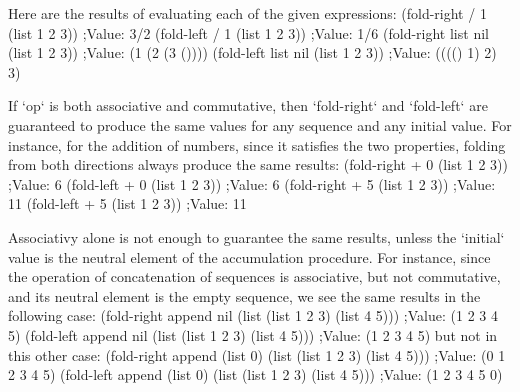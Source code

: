 Here are the results of evaluating each of the given expressions:
\begtt\scm
(fold-right / 1 (list 1 2 3))
;Value: 3/2 
(fold-left / 1 (list 1 2 3))
;Value: 1/6 
(fold-right list nil (list 1 2 3))
;Value: (1 (2 (3 ())))
(fold-left list nil (list 1 2 3))
;Value: (((() 1) 2) 3)
\endtt

If `op` is both associative and commutative,
 then `fold-right` and `fold-left` are guaranteed to produce the same values for any sequence and any initial value.  For instance, for the addition of numbers, since it satisfies the two properties, folding from both directions always produce the same results:
\begtt\scm
(fold-right + 0 (list 1 2 3))
;Value: 6
(fold-left + 0 (list 1 2 3))
;Value: 6
(fold-right + 5 (list 1 2 3))
;Value: 11
(fold-left + 5 (list 1 2 3))
;Value: 11
\endtt

Associativy alone is not enough to guarantee the same results, unless the `initial` value is the neutral element of the accumulation procedure.  For instance, since the operation of concatenation of sequences is associative, but not commutative, and its neutral element is the empty sequence, we see the same results in the following case:
\begtt\scm
(fold-right append nil (list (list 1 2 3) (list 4 5)))
;Value: (1 2 3 4 5)
(fold-left append nil (list (list 1 2 3) (list 4 5)))
;Value: (1 2 3 4 5)
\endtt
but not in this other case:
\begtt\scm
(fold-right append (list 0) (list (list 1 2 3) (list 4 5)))
;Value: (0 1 2 3 4 5)
(fold-left append (list 0) (list (list 1 2 3) (list 4 5)))
;Value: (1 2 3 4 5 0)
\endtt
